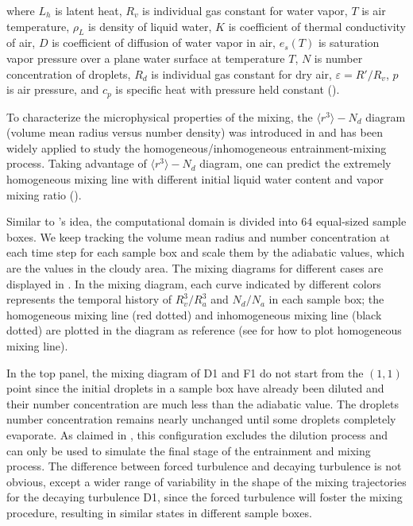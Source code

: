 \documentclass[draft,jgrga]{AGUTeX}
\begin{document}
\begin{article}
where $L_h$ is latent heat, $R_v$ is individual gas constant for water vapor, $T$ is air temperature, $\rho_L$ is density of liquid water, $K$ is coefficient of thermal conductivity of air, $D$ is coefficient of diffusion of water vapor in air, $e_s(T)$ is saturation vapor pressure over a plane water surface at temperature $T$, $N$ is number concentration of droplets, $R_d$ is individual gas constant for dry air, $\varepsilon = R'/R_v$, $p$ is air pressure, and $c_p$ is specific heat with pressure held constant (\cite{Lu2011}).

To characterize the microphysical properties of the mixing, the $\langle r^3\rangle -N_d$ diagram (volume mean radius versus number density) was introduced in \cite{Burnet07} and has been widely applied to study the homogeneous/inhomogeneous entrainment-mixing process. Taking advantage of $\langle r^3\rangle -N_d$ diagram, one can predict the extremely homogeneous mixing line with different initial liquid water content and vapor mixing ratio (\cite{Lehmann09,Kumar14}). 

Similar to \cite{Kumar14}'s idea, the computational domain is divided into $64$ equal-sized sample boxes. We keep tracking the volume mean radius and number concentration at each time step for each sample box and scale them by the adiabatic values, which are the values in the cloudy area. The mixing diagrams for different cases are displayed in . In the mixing diagram, each curve indicated by different colors represents the temporal history of $R_v^3/R_a^3$ and $N_d/N_a$ in each sample box; the homogeneous mixing line (red dotted) and inhomogeneous mixing line (black dotted) are plotted in the diagram as reference (see \cite{Burnet07} for how to plot homogeneous mixing line). 

In the top panel, the mixing diagram of D1 and F1 do not start from the $(1,1)$ point since the initial droplets in a sample box have already been diluted and their number concentration are much less than the adiabatic value. The droplets number concentration remains nearly unchanged until some droplets completely evaporate. As claimed in \cite{And04}, this configuration excludes the dilution process and can only be used to simulate the final stage of the entrainment and mixing process. The difference between forced turbulence and decaying turbulence is not obvious, except a wider range of variability in the shape of the mixing trajectories for the decaying turbulence D1, since the forced turbulence will foster the mixing procedure, resulting in similar states in different sample boxes.


\end{article}
\end{document}

